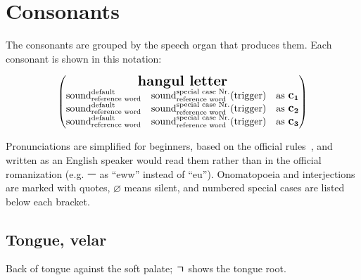 \section{Consonants}
    The consonants are grouped by the speech organ that produces them. Each consonant is shown in this notation:

    \begin{equation}
        \begin{pmatrix}
            \multicolumn{3}{c}{\textbf{\Large hangul letter}} \\
            \text{$\text{sound}^{\text{default}}_{\text{reference word}}$} & \text{$\text{sound}^{\text{special case Nr.}}_{\text{reference word}}(\text{trigger})$} & \text{as $\textbf{\large c}_\mathbf{1}$}\\
            \text{$\text{sound}^{\text{default}}_{\text{reference word}}$} & \text{$\text{sound}^{\text{special case Nr.}}_{\text{reference word}}(\text{trigger})$} & \text{as $\textbf{\large c}_\mathbf{2}$}\\
            \text{$\text{sound}^{\text{default}}_{\text{reference word}}$} & \text{$\text{sound}^{\text{special case Nr.}}_{\text{reference word}}(\text{trigger})$} & \text{as $\textbf{\large c}_\mathbf{3}$}\\
        \end{pmatrix}
    \end{equation}
   
    Pronunciations are simplified for beginners, based on the official rules~\cite{pronunciation_standard}, and written as an English speaker would read them rather than in the official romanization (e.g. ㅡ as “eww” instead of “eu”). Onomatopoeia and interjections are marked with quotes, $\varnothing$ means silent, and numbered special cases are listed below each bracket.

    \subsection{Tongue, velar}
        Back of tongue against the soft palate; ㄱ shows the tongue root.

